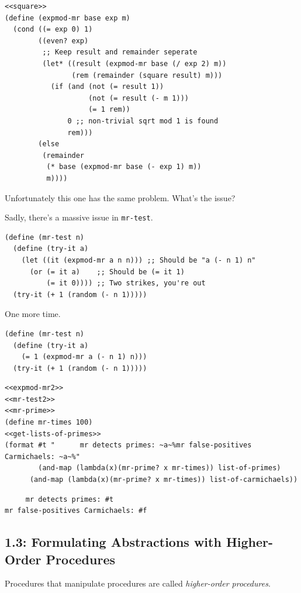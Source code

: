 \documentclass[final,fleqn,titlepage,twoside]{article}
\begin{document}
\begin{verbatim}
<<square>>
(define (expmod-mr base exp m)
  (cond ((= exp 0) 1)
        ((even? exp)
         ;; Keep result and remainder seperate
         (let* ((result (expmod-mr base (/ exp 2) m))
                (rem (remainder (square result) m)))
           (if (and (not (= result 1))
                    (not (= result (- m 1)))
                    (= 1 rem))
               0 ;; non-trivial sqrt mod 1 is found
               rem)))
        (else
         (remainder 
          (* base (expmod-mr base (- exp 1) m))
          m))))
\end{verbatim}
Unfortunately this one has the same problem. What's the issue?

Sadly, there's a massive issue in \texttt{mr-test}.
\begin{verbatim}
(define (mr-test n)
  (define (try-it a)
    (let ((it (expmod-mr a n n))) ;; Should be "a (- n 1) n"
      (or (= it a)    ;; Should be (= it 1)
          (= it 0)))) ;; Two strikes, you're out
  (try-it (+ 1 (random (- n 1)))))
\end{verbatim}

One more time.
\begin{verbatim}
(define (mr-test n)
  (define (try-it a)
    (= 1 (expmod-mr a (- n 1) n)))
  (try-it (+ 1 (random (- n 1)))))
\end{verbatim}

\begin{verbatim}
<<expmod-mr2>>
<<mr-test2>>
<<mr-prime>>
(define mr-times 100)
<<get-lists-of-primes>>
(format #t "      mr detects primes: ~a~%mr false-positives Carmichaels: ~a~%"
        (and-map (lambda(x)(mr-prime? x mr-times)) list-of-primes)
      (and-map (lambda(x)(mr-prime? x mr-times)) list-of-carmichaels))
\end{verbatim}

\begin{verbatim}
     mr detects primes: #t
mr false-positives Carmichaels: #f
\end{verbatim}

\subsection{1.3: Formulating Abstractions with Higher-Order Procedures}
\label{sec:orgdb8b840}
Procedures that manipulate procedures are called \emph{higher-order procedures}.
\end{document}
